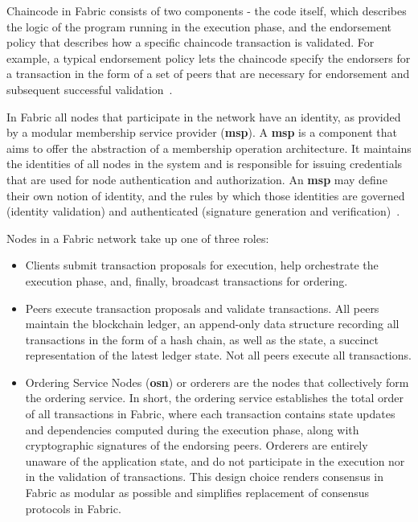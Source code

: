 Chaincode in Fabric consists of two components - the code itself, which
describes the logic of the program running in the execution phase, and the
endorsement policy that describes how a specific chaincode transaction is
validated. For example, a typical endorsement policy lets the chaincode specify
the endorsers for a transaction in the form of a set of peers that are
necessary for endorsement and subsequent successful
validation~\cite{Androulaki2018}.

In Fabric all nodes that participate in the network have an identity, as
provided by a modular membership service provider (\textbf{msp}).  A
\textbf{msp} is a component that aims to offer the abstraction of a membership
operation architecture.  It maintains the identities of all nodes in the system
and is responsible for issuing credentials that are used for node
authentication and authorization. An \textbf{msp} may define their own notion
of identity, and the rules by which those identities are governed (identity
validation) and authenticated (signature generation and
verification)~\cite{HyperledgerFabricDocs2017}.

Nodes in a Fabric network take up one of three roles:

\begin{itemize}
  \item Clients submit transaction proposals for execution, help orchestrate
    the execution phase, and, finally, broadcast transactions for ordering.

  \item Peers execute transaction proposals and validate transactions.  All
    peers maintain the blockchain ledger, an append-only data structure
    recording all transactions in the form of a hash chain, as well as the
    state, a succinct representation of the latest ledger state. Not all peers
    execute all transactions.

  \item Ordering Service Nodes (\textbf{osn}) or orderers are the nodes that
    collectively form the ordering service. In short, the ordering service
    establishes the total order of all transactions in Fabric, where each
    transaction contains state updates and dependencies computed during the
    execution phase, along with cryptographic signatures of the endorsing
    peers.  Orderers are entirely unaware of the application state, and do not
    participate in the execution nor in the validation of transactions. This
    design choice renders consensus in Fabric as modular as possible and
    simplifies replacement of consensus protocols in Fabric. 
\end{itemize}

